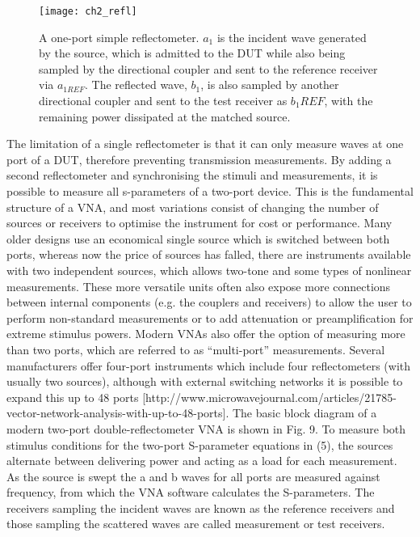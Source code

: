 \documentclass[../thesis.tex]{subfiles}
\begin{document}
\begin{refsection}
\begin{figure}
	\centering
	\texttt{[image: ch2\_refl]}
	\caption{A one-port simple reflectometer. $a_1$ is the incident wave generated by the source, which is admitted to the DUT while also being sampled by the directional coupler and sent to the reference receiver via $a_{1REF}$. The reflected wave, $b_1$, is also sampled by another directional coupler and sent to the test receiver as $b_1{REF}$, with the remaining power dissipated at the matched source.}
	\label{ch2_refl}
\end{figure}

The limitation of a single reflectometer is that it can only measure waves at one port of a DUT, therefore preventing transmission measurements. By adding a second reflectometer and synchronising the stimuli and measurements, it is possible to measure all s-parameters of a two-port device. This is the fundamental structure of a VNA, and most variations consist of changing the number of sources or receivers to optimise the instrument for cost or performance. Many older designs use an economical single source which is switched between both ports, whereas now the price of sources has falled, there are instruments available with two independent sources, which allows two-tone and some types of nonlinear measurements. These more versatile units often also expose more  connections between internal components (e.g. the couplers and receivers) to allow the user to perform non-standard measurements or to add attenuation or preamplification for extreme stimulus powers.
Modern VNAs also offer the option of measuring more than two ports, which are referred to as “multi-port” measurements. Several manufacturers offer four-port instruments which include four reflectometers (with usually two sources), although with external switching networks it is possible to expand this up to 48 ports [http://www.microwavejournal.com/articles/21785-vector-network-analysis-with-up-to-48-ports].
The basic block diagram of a modern two-port double-reflectometer VNA is shown in Fig. 9. To measure both stimulus conditions for the two-port S-parameter equations in (5), the sources alternate between delivering power and acting as a load for each measurement. As the source is swept the a and b waves for all ports are measured against frequency, from which the VNA software calculates the S-parameters. The receivers sampling the incident waves are known as the reference receivers and those sampling the scattered waves are called measurement or test receivers.


\end{refsection}
\end{document}
